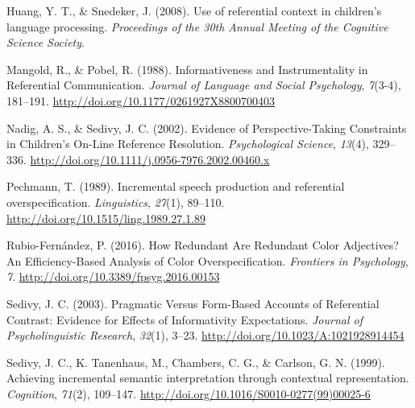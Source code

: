 \documentclass[10pt, letterpaper]{article}
\begin{document}
\leavevmode\hypertarget{ref-huangsnedeker2008}{}%
Huang, Y. T., \& Snedeker, J. (2008). Use of referential context in
children's language processing. \emph{Proceedings of the 30th Annual
Meeting of the Cognitive Science Society}.

\leavevmode\hypertarget{ref-mangold_informativeness_1988}{}%
Mangold, R., \& Pobel, R. (1988). Informativeness and Instrumentality in
Referential Communication. \emph{Journal of Language and Social
Psychology}, \emph{7}(3-4), 181--191.
\url{http://doi.org/10.1177/0261927X8800700403}

\leavevmode\hypertarget{ref-nadig_evidence_2002}{}%
Nadig, A. S., \& Sedivy, J. C. (2002). Evidence of Perspective-Taking
Constraints in Children's On-Line Reference Resolution.
\emph{Psychological Science}, \emph{13}(4), 329--336.
\url{http://doi.org/10.1111/j.0956-7976.2002.00460.x}

\leavevmode\hypertarget{ref-pechmann_incremental_1989}{}%
Pechmann, T. (1989). Incremental speech production and referential
overspecification. \emph{Linguistics}, \emph{27}(1), 89--110.
\url{http://doi.org/10.1515/ling.1989.27.1.89}

\leavevmode\hypertarget{ref-rubio-fernandez_how_2016}{}%
Rubio-Fernández, P. (2016). How Redundant Are Redundant Color
Adjectives? An Efficiency-Based Analysis of Color Overspecification.
\emph{Frontiers in Psychology}, \emph{7}.
\url{http://doi.org/10.3389/fpsyg.2016.00153}

\leavevmode\hypertarget{ref-sedivy_pragmatic_2003-2}{}%
Sedivy, J. C. (2003). Pragmatic Versus Form-Based Accounts of
Referential Contrast: Evidence for Effects of Informativity
Expectations. \emph{Journal of Psycholinguistic Research}, \emph{32}(1),
3--23. \url{http://doi.org/10.1023/A:1021928914454}

\leavevmode\hypertarget{ref-sedivy_achieving_1999}{}%
Sedivy, J. C., K. Tanenhaus, M., Chambers, C. G., \& Carlson, G. N.
(1999). Achieving incremental semantic interpretation through contextual
representation. \emph{Cognition}, \emph{71}(2), 109--147.
\url{http://doi.org/10.1016/S0010-0277(99)00025-6}


\end{document}
